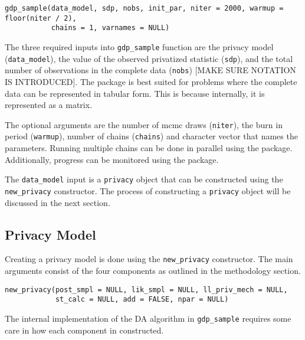 \begin{verbatim}
gdp_sample(data_model, sdp, nobs, init_par, niter = 2000, warmup = floor(niter / 2),
           chains = 1, varnames = NULL)
\end{verbatim}

The three required inputs into \texttt{gdp\_sample} function are the privacy model (\texttt{data\_model}), the value
of the observed privatized statistic (\texttt{sdp}), and the total number of observations
in the complete data (\texttt{nobs}) {[}MAKE SURE NOTATION IS INTRODUCED{]}. The 
package is best suited for problems where the complete data can be represented in
tabular form. This is because internally, it is represented as a matrix.

The optional arguments are the number of mcmc draws (\texttt{niter}), the
burn in period (\texttt{warmup}), number of chains (\texttt{chains}) and character
vector that names the parameters. Running multiple chains can be done in parallel
using the  package. Additionally, progress can be monitored
using the  package.

The \texttt{data\_model} input is a \texttt{privacy}
object that can be constructed using the \texttt{new\_privacy} constructor. The
process of constructing a \texttt{privacy} object will be discussed in the next section.

\hypertarget{privacy-model}{%
\subsection{Privacy Model}\label{privacy-model}}

Creating a privacy model is done using the \texttt{new\_privacy} constructor. The
main arguments consist of the four components as outlined in the methodology
section.

\begin{verbatim}
new_privacy(post_smpl = NULL, lik_smpl = NULL, ll_priv_mech = NULL,
            st_calc = NULL, add = FALSE, npar = NULL)
\end{verbatim}

The internal implementation of the DA algorithm in \texttt{gdp\_sample} requires
some care in how each component in constructed.

